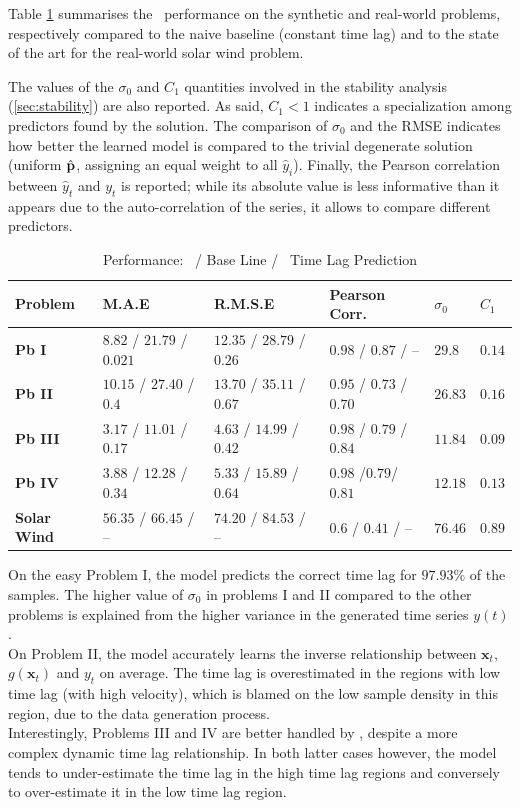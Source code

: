 Table \ref{tab:results_syn} summarises the \XX\ performance on the synthetic and real-world 
problems, respectively compared to the naive baseline (constant time lag) and to the state of the 
art for the real-world solar wind problem. 

The values of the $\sigma_0$ and $C_1$ quantities involved in the stability analysis 
(\cref{sec:stability}) are also reported. As said, $C_1 < 1$ indicates a specialization 
among predictors found by the solution. The comparison of $\sigma_0$ and the RMSE indicates how 
better the learned model is compared to the trivial degenerate solution (uniform $\hat {\bf p}$, 
assigning an equal weight to all $\hat y_i$). Finally, the Pearson correlation between 
$\hat y_t$ and $y_t$ is reported; while its absolute value is less informative than it appears due 
to the auto-correlation of the series, it allows to compare different predictors. 

\begin{table}
  \caption{Performance: \XX  \ / Base Line / \XX  \ Time Lag Prediction}\label{tab:results_syn}
  \centering
  \begin{tabular}{ l l l l l l}
  \hline
  Problem &  M.A.E & R.M.S.E & Pearson Corr. & $\sigma_0$ & $C_1$\\
  \hline
  \textbf{Pb I} & $8.82$ / $21.79$ / $0.021$  & $12.35$ / $28.79$ / $0.26$ & $0.98$ / $0.87$ / -- & $29.8$ & $0.14$\\
  \textbf{Pb II} & $10.15$ / $27.40$ / $0.4$ & $13.70$ / $35.11$ / $0.67$ & $0.95$ / $0.73$ / $0.70$ & $26.83$ & $0.16$\\
  \textbf{Pb III} & $3.17$ / $11.01$ / $0.17$ & $4.63$ / $14.99$ / $0.42$ & $0.98$ / $0.79$ / $0.84$ & $11.84$ & $0.09$\\
  \textbf{Pb IV} & $3.88$ / $12.28$ / $0.34$ & $5.33$ / $15.89$ / $0.64$ & $0.98$ /$0.79$/ $0.81$ & $12.18$ & $0.13$\\
  \textbf{Solar Wind} & $56.35$ / $66.45$ / -- & $74.20$ / $84.53$ / -- & $0.6$ / $0.41$ / -- & $76.46$ & $0.89$\\
  \hline
  \end{tabular}
\end{table}

On the easy Problem I, the model predicts the correct time lag for $97.93\%$ of the samples. The 
higher value of $\sigma_0$ in problems I and II compared to the other problems is explained from 
the higher variance in the generated  time series $y(t)$. \\
On Problem II, the model accurately learns the inverse relationship between 
$\mathbf{x}_t$, $g(\mathbf{x}_t)$ and $y_t$ on average. The time lag is 
overestimated in the regions with low time lag (with high velocity), which is 
blamed on the low sample density in this region, due to the data generation 
process. \\
Interestingly, Problems III and IV are better handled by \XX, despite a more complex dynamic time 
lag relationship. In both latter cases however, the model tends to under-estimate the time lag in 
the high time lag regions and conversely to over-estimate it in the low time lag region. 

